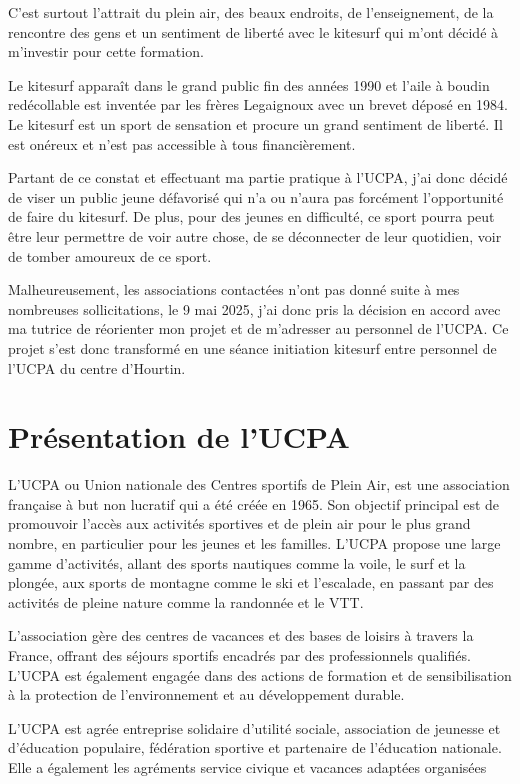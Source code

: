 \documentclass[11pt,a4paper]{report}
\begin{document}
C'est surtout l'attrait du plein air, des beaux endroits,
de l'enseignement, de la rencontre
des gens et un sentiment de liberté avec le kitesurf qui 
m'ont décidé à m'investir pour cette formation.

Le kitesurf apparaît dans le grand public fin des années 1990 et
l'aile à boudin redécollable est inventée par les frères Legaignoux avec 
un brevet déposé en 1984\cite{brevet_kite}.
Le kitesurf est un sport de sensation et procure un grand
sentiment de liberté. Il est onéreux et n'est pas accessible à tous
financièrement.

Partant de ce constat et effectuant ma partie pratique à l'UCPA\cite{ucpa},
j'ai donc décidé de viser un public jeune défavorisé qui n'a ou n'aura
pas forcément l'opportunité de faire du kitesurf. 
De plus, pour des jeunes en difficulté, ce sport pourra peut être 
leur permettre de voir autre chose, de se déconnecter de leur quotidien,
voir de tomber amoureux de ce sport.

Malheureusement, les associations contactées n'ont pas donné suite
à mes nombreuses sollicitations,
le 9 mai 2025, j'ai donc pris la décision en accord avec 
ma tutrice de réorienter mon projet et de m'adresser au personnel de 
l'UCPA. Ce projet s'est donc transformé en une séance initiation kitesurf 
entre personnel de l'UCPA du centre d'Hourtin.

\section{Présentation de l'UCPA}

L'UCPA ou Union nationale des Centres sportifs de Plein Air, est une association
française à but non lucratif qui a été créée en 1965. Son objectif principal est
de promouvoir l'accès aux activités sportives et de plein air pour le plus grand
nombre, en particulier pour les jeunes et les familles. L'UCPA propose une large
gamme d'activités, allant des sports nautiques comme la voile, le surf et la plongée,
aux sports de montagne comme le ski et l'escalade, en passant par des activités de
pleine nature comme la randonnée et le VTT.

L'association gère des centres de vacances et des bases de loisirs à travers la
France, offrant des séjours sportifs encadrés par des professionnels qualifiés.
L'UCPA est également engagée dans des actions de formation et de sensibilisation 
à la protection de l'environnement et au développement durable.

L’UCPA est agrée entreprise solidaire d’utilité sociale, association de
jeunesse et d’éducation populaire, fédération sportive et partenaire de 
l’éducation nationale. Elle a également les agréments service civique et
vacances adaptées organisées
\end{document}

